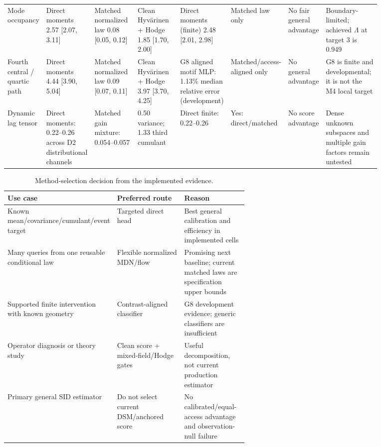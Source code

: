 \begin{landscape}
\begin{longtable}{p{0.08\linewidth}p{0.12\linewidth}p{0.12\linewidth}p{0.12\linewidth}p{0.12\linewidth}p{0.08\linewidth}p{0.08\linewidth}p{0.15\linewidth}}
Mode occupancy & Direct moments 2.57 [2.07, 3.11] & Matched normalized law 0.08 [0.05, 0.12] & Clean Hyv\"arinen + Hodge 1.85 [1.70, 2.00] & Direct moments (finite) 2.48 [2.01, 2.98] & Matched law only & No fair general advantage & Boundary-limited; achieved $\Lambda$ at target 3 is 0.949 \\
Fourth central / quartic path & Direct moments 4.44 [3.90, 5.04] & Matched normalized law 0.09 [0.07, 0.11] & Clean Hyv\"arinen + Hodge 3.97 [3.70, 4.25] & G8 aligned motif MLP: 1.13\% median relative error (development) & Matched/access-aligned only & No general advantage & G8 is finite and developmental; it is not the M4 local target \\
Dynamic lag tensor & Direct moments: 0.22--0.26 across D2 distributional channels & Matched gain mixture: 0.054--0.057 & 0.50 variance; 1.33 third cumulant & Direct finite: 0.22--0.26 & Yes: direct/matched & No score advantage & Dense unknown subspaces and multiple gain factors remain untested \\
\bottomrule\end{longtable}\end{landscape}
\begin{table}[H]\centering\small
\caption{Method-selection decision from the implemented evidence.}
\begin{tabularx}{\linewidth}{p{0.28\linewidth}p{0.28\linewidth}X}\toprule
Use case & Preferred route & Reason\\\midrule
Known mean/covariance/cumulant/event target & Targeted direct head & Best general calibration and efficiency in implemented cells \\
Many queries from one reusable conditional law & Flexible normalized MDN/flow & Promising next baseline; current matched laws are specification upper bounds \\
Supported finite intervention with known geometry & Contrast-aligned classifier & G8 development evidence; generic classifiers are insufficient \\
Operator diagnosis or theory study & Clean score + mixed-field/Hodge gates & Useful decomposition, not current production estimator \\
Primary general SID estimator & Do not select current DSM/anchored score & No calibrated/equal-access advantage and observation-null failure \\
\bottomrule\end{tabularx}\end{table}
